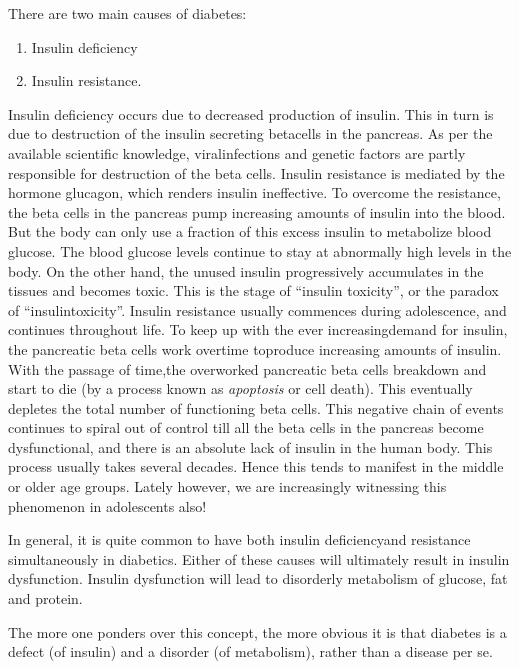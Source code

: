 There are two main causes of diabetes:

\vspace{-\topsep}
\begin{enumerate}
\itemsep=0pt
\item Insulin deficiency
 \item Insulin resistance.
\end{enumerate}
\vspace{-\topsep}

Insulin deficiency occurs due to decreased production of insulin. This in turn is due to destruction of the insulin secreting beta\break cells in the pancreas. As per the available scientific knowledge, viral\break infe\-ctions and genetic factors are partly responsible for destruction of the beta cells. Insulin resistance is mediated by the hormone glucagon, which renders insulin ineffective. To overcome the resistance, the beta cells in the pancreas pump increasing amounts of insulin into the blood. But the body can only use a fraction of this excess insulin to meta\-bolize blood glucose. The blood glucose levels continue to stay at abnormally high levels in the body. On the other hand, the unused insu\-lin progressively accumulates in the tissues and becomes toxic. This is the stage of “insulin toxicity”, or the paradox of “insulin\break toxicity”. Insulin resi\-stance usually commences during adolescence, and continues throughout life. To keep up with the ever increasing\break demand for insulin, the pancreatic beta cells work overtime to\break produce increasing amounts of insulin. With the passage of time,\break the overworked pancreatic beta cells breakdown and start to die (by a process known as \textit{apoptosis} or cell death). This eventually depletes the total number of functioning beta cells. This negative chain of events conti\-nues to spiral out of control till all the beta cells in the pancreas become dysfunc\-tional, and there is an absolute lack of insulin in the human body. This process usually takes several decades. Hence this tends to manifest in the middle or older age groups. Lately however, we are increasingly witnessing this phenomenon in adolescents also!

In general, it is quite common to have both insulin deficiency\break and resistance simultaneously in diabetics. Either of these causes will ultimately result in insulin dysfunction. Insulin dysfunction will lead to disorderly metabolism of glucose, fat and protein.

The more one ponders over this concept, the more obvious it is that diabetes is a defect (of insulin) and a disorder (of metabolism), rather than a disease per se.

